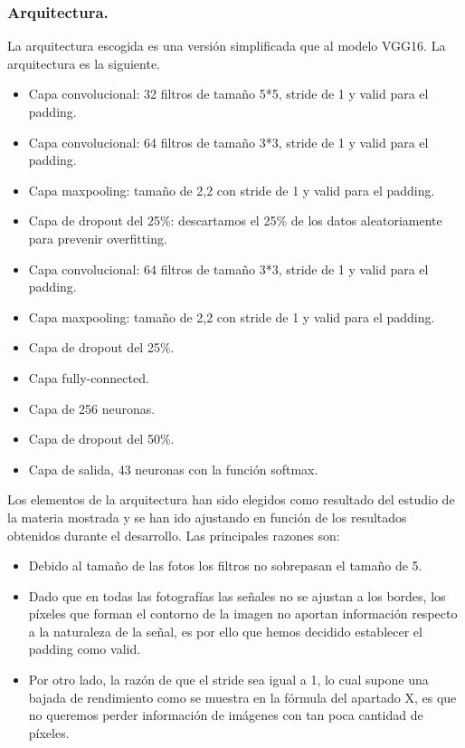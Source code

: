 \documentclass[a4paper,10pt]{article}
\begin{document}
\subsubsection{Arquitectura.}
La arquitectura escogida es una versión simplificada que al modelo VGG16. La arquitectura es la siguiente.
\begin{itemize}
\item Capa convolucional: 32 filtros de tamaño 5*5, stride de 1 y valid para el padding.
\item Capa convolucional: 64 filtros de tamaño 3*3, stride de 1 y valid para el padding.
\item Capa maxpooling: tamaño de 2,2 con stride de 1 y valid para el padding.
\item Capa de dropout del 25\%: descartamos el 25\% de los datos aleatoriamente para prevenir overfitting.
\item Capa convolucional: 64 filtros de tamaño 3*3, stride de 1 y valid para el padding.
\item Capa maxpooling: tamaño de 2,2 con stride de 1 y valid para el padding.
\item Capa de dropout del 25\%.
\item Capa fully-connected.
\item Capa de 256 neuronas.
\item Capa de dropout del 50\%.
\item Capa de salida, 43 neuronas con la función softmax.
\end{itemize}
Los elementos de la arquitectura han sido elegidos como resultado del estudio de la materia mostrada y se han ido ajustando en función de los resultados obtenidos durante el desarrollo. Las principales razones son:
\begin{itemize}
\item Debido al tamaño de las fotos los filtros no sobrepasan el tamaño de 5. 
\item Dado que en todas las fotografías las señales no se ajustan a los bordes, los píxeles que forman el contorno de la imagen no aportan información respecto a la naturaleza de la señal, es por ello que hemos decidido establecer el padding como valid.
\item Por otro lado, la razón de que el stride sea igual a 1, lo cual supone una bajada de rendimiento como se muestra en la fórmula del apartado X, es que no queremos perder información de imágenes con tan poca cantidad de píxeles.
\end{itemize}
\end{document}
